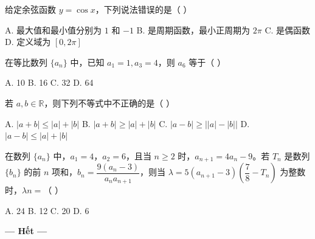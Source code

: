 \documentclass[11pt, a4paper]{article}
\begin{document}
\begin{baitap}[45]
给定余弦函数 $y = \cos x$，下列说法错误的是（ ）
\par\vspace{3pt}
\noindent A. 最大值和最小值分别为 $1$ 和 $-1$ \quad B. 是周期函数，最小正周期为 $2\pi$ \quad C. 是偶函数 \quad D. 定义域为 $[0, 2\pi]$
\end{baitap}

\begin{baitap}[46]
在等比数列 $\{a_n\}$ 中，已知 $a_1 = 1, a_3 = 4$，则 $a_6$ 等于（ ）
\par\vspace{3pt}
\noindent A. 10 \quad B. 16 \quad C. 32 \quad D. 64
\end{baitap}

\begin{baitap}[47]
若 $a, b \in \mathbb{R}$，则下列不等式中不正确的是（ ）
\par\vspace{3pt}
\noindent A. $\lvert a + b \rvert \le \lvert a \rvert + \lvert b \rvert$ \quad B. $\lvert a + b \rvert \ge \lvert a \rvert + \lvert b \rvert$ \quad C. $\lvert a - b \rvert \ge \lvert \lvert a \rvert - \lvert b \rvert \rvert$ \quad D. $\lvert a - b \rvert \le \lvert a \rvert + \lvert b \rvert$
\end{baitap}

\begin{baitap}[48]
在数列 $\{a_n\}$ 中，$a_1 = 4$，$a_2 = 6$，且当 $n \ge 2$ 时，$a_{n+1} = 4a_n - 9$。若 $T_n$ 是数列 $\{b_n\}$ 的前 $n$ 项和，$b_n = \dfrac{9(a_n - 3)}{a_n a_{n+1}}$，则当 $\lambda = 5(a_{n+1} - 3)\left(\dfrac{7}{8} - T_n\right)$ 为整数时，$\lambda n =$（ ）
\par\vspace{3pt}
\noindent A. 24 \quad B. 12 \quad C. 20 \quad D. 6
\end{baitap}

\vspace{0.5cm}
\begin{center}
\textbf{--- Hết ---}
\end{center}
\end{document}
